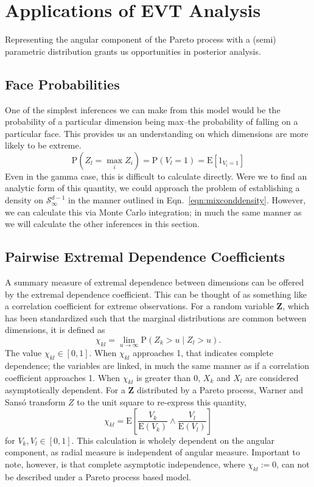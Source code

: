 \section{Applications of EVT Analysis}
Representing the angular component of the Pareto process with a (semi) parametric distribution grants
  us opportunities in posterior analysis.

\subsection{Face Probabilities}
One of the simplest inferences we can make from this model would be the probability of a particular
  dimension being max--the probability of falling on a particular face.  This provides us an
  understanding on which dimensions are more likely to be extreme.
  \begin{equation}
    \text{P}\left(Z_l = \max_{i}Z_i\right) = \text{P}\left(V_l = 1\right) = \text{E}\left[1_{V_l = 1}\right]
  \end{equation}
  Even in the gamma case, this is difficult to calculate directly. Were we to find an analytic form
  of this quantity, we could approach the problem of establishing a density on $\mathcal{S}_{\infty}^{d-1}$
  in the manner outlined in Eqn.~\ref{eqn:mixconddensity}.  However, we can calculate this via
  Monte Carlo integration; in much the same manner as we will calculate the other inferences in this
  section.

\subsection{Pairwise Extremal Dependence Coefficients}
A summary measure of extremal dependence between dimensions can be offered by the extremal dependence
  coefficient.  This can be thought of as something like a correlation coefficient for extreme
  observations.  For a random variable $\bm{Z}$, which has been standardized such that the marginal
  distributions are common between dimensions, it is defined as
  \begin{equation}
    \chi_{kl} = \lim\limits_{u\to\infty}\text{P}\left(Z_k > u\mid Z_l > u\right).
  \end{equation}
  The value $\chi_{kl} \in [0,1]$.  When $\chi_{kl}$ approaches 1, that indicates complete dependence;
  the variables are linked, in much the same manner as if a correlation coefficient approaches 1.
  When $\chi_{kl}$ is greater than 0, $X_k$ and $X_l$ are considered asymptotically dependent.  For
  a $\bm{Z}$ distributed by a Pareto process, Warner and Sans{\'o}\cite{warner2018} transform $Z$
  to the unit square to re-express this quantity,
  \begin{equation}
    \label{eqn:extdepcoef}
    \chi_{kl} = \text{E}\left[\frac{V_k}{\text{E}(V_k)}\wedge\frac{V_l}{\text{E}(V_l)}\right]
  \end{equation}
  for $V_k,V_l \in [0,1]$.  This calculation is wholely dependent on the angular component, as radial
  measure is independent of angular measure.  Important to note, however, is that complete asymptotic
  independence, where $\chi_{kl} := 0$, can not be described under a Pareto process based model.

